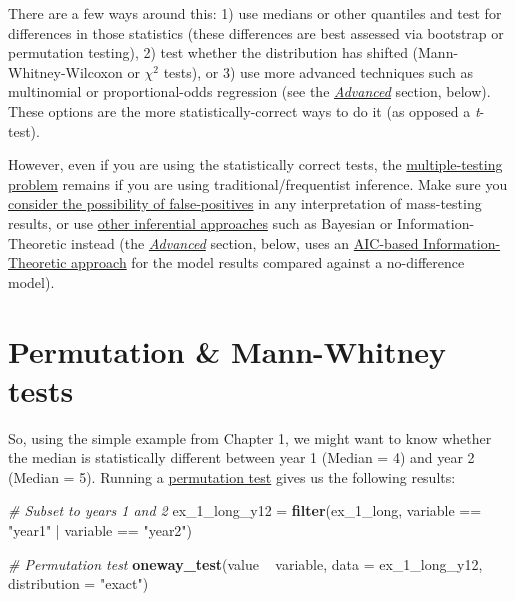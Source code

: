 \documentclass[]{book}
\newenvironment{Shaded}{\begin{snugshade}}{\end{snugshade}}
\newcommand{\KeywordTok}[1]{\textcolor[rgb]{0.13,0.29,0.53}{\textbf{{#1}}}}
\newcommand{\DataTypeTok}[1]{\textcolor[rgb]{0.13,0.29,0.53}{{#1}}}
\newcommand{\StringTok}[1]{\textcolor[rgb]{0.31,0.60,0.02}{{#1}}}
\newcommand{\CommentTok}[1]{\textcolor[rgb]{0.56,0.35,0.01}{\textit{{#1}}}}
\newcommand{\NormalTok}[1]{{#1}}
\begin{document}
There are a few ways around this: 1) use medians or other quantiles and
test for differences in those statistics (these differences are best
assessed via bootstrap or permutation testing), 2) test whether the
distribution has shifted (Mann-Whitney-Wilcoxon or \(\chi^2\) tests), or
3) use more advanced techniques such as multinomial or proportional-odds
regression (see the \protect\hyperlink{Advanced}{\emph{Advanced}}
section, below). These options are the more statistically-correct ways
to do it (as opposed a \emph{t}-test).

However, even if you are using the statistically correct tests, the
\href{https://en.wikipedia.org/wiki/Multiple_comparisons_problem}{multiple-testing
problem} remains if you are using traditional/frequentist inference.
Make sure you \href{http://xkcd.com/882/}{consider the possibility of
false-positives} in any interpretation of mass-testing results, or use
\href{http://labstats.net/articles/overview.html}{other inferential
approaches} such as Bayesian or Information-Theoretic instead (the
\protect\hyperlink{Advanced}{\emph{Advanced}} section, below, uses an
\href{https://en.wikipedia.org/wiki/Akaike_information_criterion}{AIC-based
Information-Theoretic approach} for the model results compared against a
no-difference model).

\section{Permutation \& Mann-Whitney
tests}\label{permutation-mann-whitney-tests}

So, using the simple example from Chapter 1, we might want to know
whether the median is statistically different between year 1 (Median =
4) and year 2 (Median = 5). Running a
\href{https://en.wikipedia.org/wiki/Resampling_(statistics)\#Permutation_tests}{permutation
test} gives us the following results:

\begin{Shaded}
\begin{Highlighting}[]
\CommentTok{# Subset to years 1 and 2}
\NormalTok{ex_1_long_y12 =}\StringTok{ }\KeywordTok{filter}\NormalTok{(ex_1_long, variable ==}\StringTok{ "year1"} \NormalTok{|}\StringTok{ }\NormalTok{variable ==}\StringTok{ "year2"}\NormalTok{)}

\CommentTok{# Permutation test}
\KeywordTok{oneway_test}\NormalTok{(value ~}\StringTok{ }\NormalTok{variable, }\DataTypeTok{data =} \NormalTok{ex_1_long_y12, }\DataTypeTok{distribution =} \StringTok{"exact"}\NormalTok{)}
\end{Highlighting}
\end{Shaded}
\end{document}
